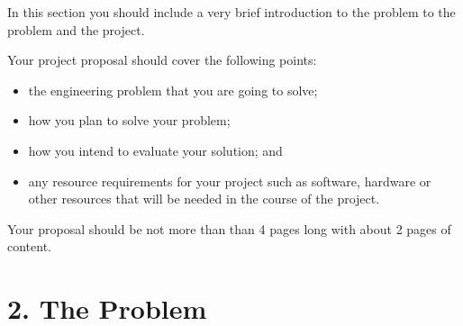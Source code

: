 \documentclass[11pt, a4paper, twoside, openright]{report}
\begin{document}
In this section you should include a very brief introduction to the
problem to the problem and the project.

Your project proposal should cover the following points:

\begin{itemize}
    \item the engineering problem that you are going to solve;
    \item how you plan to solve your problem;
    \item how you intend to evaluate your solution; and
    \item any resource requirements for your project such as software,
        hardware or other resources that will be needed in the course of the
        project.
\end{itemize}


Your proposal should be not more than than 4 pages long with about 2 pages of content.

\section*{2. The Problem}

\end{document}
